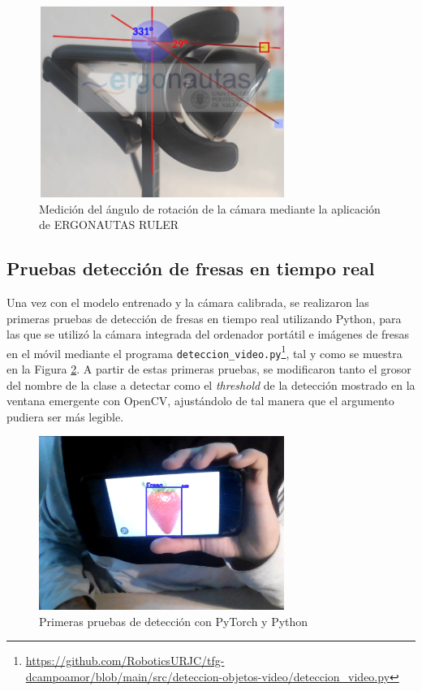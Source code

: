  \begin{figure}[H]
     \centering
     \begin{center}
       \includegraphics[width=80mm]{figs/ERGONAUTAS Medicion angulo.png}
     \end{center}
     \caption{Medición del ángulo de rotación de la cámara mediante la aplicación de ERGONAUTAS RULER}
    \label{fig:medicion_angulo_ERGONAUTAS}
  \end{figure}


\subsection{Pruebas detección de fresas en tiempo real}
\label{sec:Pruebas_Fresas_Pytorch}

Una vez con el modelo entrenado y la cámara calibrada, se realizaron las primeras pruebas de detección de fresas en tiempo real utilizando Python, para las que se utilizó la cámara integrada del ordenador portátil e imágenes de fresas en el móvil mediante el programa \verb|deteccion_video.py|\footnote{\url{https://github.com/RoboticsURJC/tfg-dcampoamor/blob/main/src/deteccion-objetos-video/deteccion_video.py}}, tal y como se muestra en la Figura \ref{fig:primerasdetecciones_Python}. A partir de estas primeras pruebas, se modificaron tanto el grosor del nombre de la clase a detectar como el \textit{threshold} de la detección mostrado en la ventana emergente con OpenCV, ajustándolo de tal manera que el argumento pudiera ser más legible.

  \begin{figure}[H]
     \centering
     \begin{center}
       \includegraphics[width=80mm]{figs/deteccion_video fresa en foto.png}
     \end{center}
     \caption{Primeras pruebas de detección con PyTorch y Python}
    \label{fig:primerasdetecciones_Python}
  \end{figure}
  

